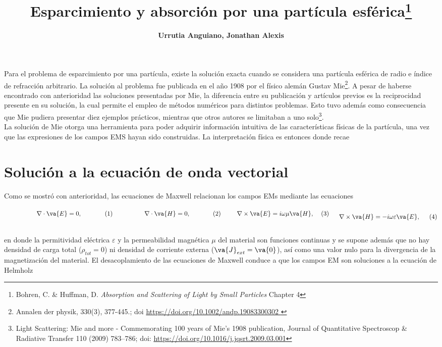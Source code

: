 \documentclass[letterpaper,11pt] {article}
\title{\Large \bf Esparcimiento y absorción por una partícula esférica\footnote{Bohren, C. \& Huffman, D. \emph{Absorption and Scattering of Light by Small Particles} Chapter 4}}
\author{\bf Urrutia Anguiano, Jonathan Alexis}
\date{}
\newcommand{\beqhalf}{\noindent \begin{minipage}[c]{.5\linewidth} \begin{equation}}
\newcommand{\eeqhalf}{\end{equation} \end{minipage} }
\newcommand{\eqhalf}[1]{\beqhalf #1 \eeqhalf}
\begin{document}
\maketitle

Para el problema de esparcimiento por una partícula, existe la solución exacta cuando se considera una partícula esférica de radio e índice de refracción arbitrario.  La solución al problema fue publicada en el año 1908 por el físico alemán Gustav Mie\footnote{Annalen der physik, 330(3), 377-445.; doi \url{https://doi.org/10.1002/andp.19083300302 }}. A pesar de haberse encontrado con anterioridad las soluciones presentadas por Mie, la diferencia entre su publicación y artículos previos es la reciprocidad presente en su solución, la cual permite el empleo de métodos numéricos para distintos problemas. Esto tuvo además como consecuencia que Mie pudiera presentar diez ejemplos  prácticos, mientras que otros autores se limitaban a uno solo\footnote{Light Scattering: Mie and more - Commemorating  100 years of Mie's 1908 publication, Journal of Quantitative Spectroscop \& Radiative Transfer 110 (2009) 783–786; doi: \url{https://doi.org/10.1016/j.jqsrt.2009.03.001}}.\\

La solución de Mie otorga una herramienta para poder adquirir información intuitiva de las características físicas de la  partícula, una vez que las expresiones de los campos EMS hayan sido construidas. La interpretación física es entonces donde recae 
 
	
	
	
	
	\section{Solución a la ecuación de onda vectorial}
	
Como se mostró con anterioridad, las ecuaciones de Maxwell relacionan los campos EMs mediante las ecuaciones\\

	\begin{subequations}
	\eqhalf{\nabla\cdot \va{E} = 0, }
	\eqhalf{\nabla\cdot \va{H} = 0,}
	\eqhalf{\nabla \times \va{E} = i\omega\mu \va{H}, }
	\eqhalf{\nabla\times\va{H} = - i \omega\varepsilon \va{E}, }	
	\label{eq:MaxwellArm}
	\end{subequations}\\
en donde la permitividad eléctrica $\varepsilon$ y la permeabilidad magnética $\mu$ del material son funciones continuas y  se supone además que no hay densidad de carga total ($\rho_{tot} =0$) ni densidad de corriente externa ($\va{J}_{ext} = \va{0}$), así como una valor nulo para la divergencia de la magnetización del material. El desacoplamiento de las ecuaciones de Maxwell conduce a que los campos EM son soluciones a la ecuación de Helmholz\\
\end{document}
